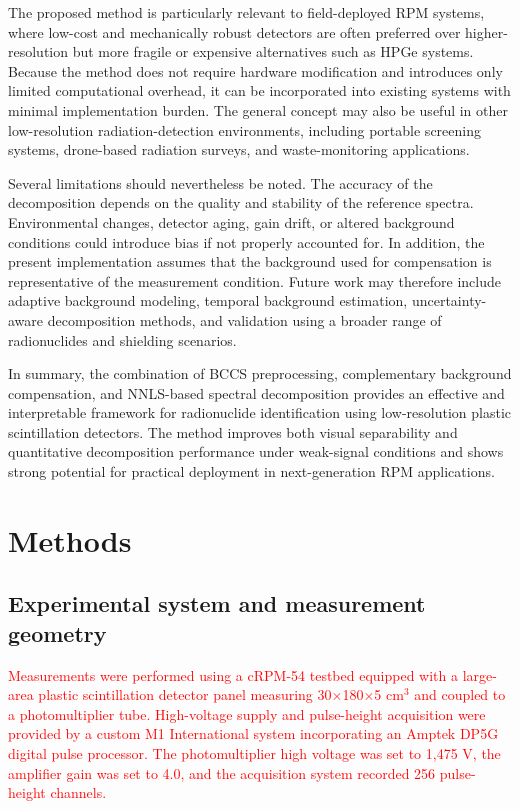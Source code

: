 \documentclass[pdflatex,sn-mathphys-num, table]{sn-jnl}%
\theoremstyle{thmstyleone}%
\theoremstyle{thmstyletwo}%
\theoremstyle{thmstylethree}%
\begin{document}
The proposed method is particularly relevant to field-deployed RPM systems, where low-cost and mechanically robust detectors are often preferred over higher-resolution but more fragile or expensive alternatives such as HPGe systems. Because the method does not require hardware modification and introduces only limited computational overhead, it can be incorporated into existing systems with minimal implementation burden. The general concept may also be useful in other low-resolution radiation-detection environments, including portable screening systems, drone-based radiation surveys, and waste-monitoring applications.

Several limitations should nevertheless be noted. The accuracy of the decomposition depends on the quality and stability of the reference spectra. Environmental changes, detector aging, gain drift, or altered background conditions could introduce bias if not properly accounted for. In addition, the present implementation assumes that the background used for compensation is representative of the measurement condition. Future work may therefore include adaptive background modeling, temporal background estimation, uncertainty-aware decomposition methods, and validation using a broader range of radionuclides and shielding scenarios.

In summary, the combination of BCCS preprocessing, complementary background compensation, and NNLS-based spectral decomposition provides an effective and interpretable framework for radionuclide identification using low-resolution plastic scintillation detectors. The method improves both visual separability and quantitative decomposition performance under weak-signal conditions and shows strong potential for practical deployment in next-generation RPM applications.


\section*{Methods}
\subsection*{Experimental system and measurement geometry}

\textcolor{red}{Measurements  were  performed  using  a  cRPM-54  testbed  equipped  with  a large-area  plastic  scintillation detector  panel  measuring  30$\times$180$\times$5 $\text{cm}^3$  and  coupled  to  a  photomultiplier  tube.  High-voltage  supply  and pulse-height acquisition were provided by a custom M1 International system incorporating an Amptek DP5G digital pulse processor\cite{cRPM54Manual}. The photomultiplier high voltage was set to 1,475 V, the amplifier gain was set to 4.0, and the acquisition system recorded 256 pulse-height channels.}
\end{document}
